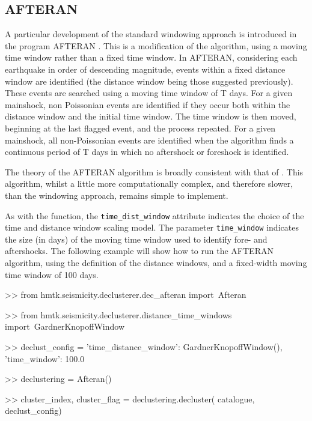 \subsection{AFTERAN \parencite{Musson1999PSHABalkan}}

A particular development of the standard windowing approach is introduced in the program AFTERAN \parencite{Musson1999PSHABalkan}. This is a modification of the \textcite{GardnerKnopoff1974} algorithm, using a moving time window rather than a fixed time window. In AFTERAN, considering each earthquake in order of descending magnitude, events within a fixed distance window are identified (the distance window being those suggested previously). These events are searched using a moving time window of T days. For a given mainshock, non Poissonian events are identified if they occur both within the distance window and the initial time window. The time window is then moved, beginning at the last flagged event, and the process repeated. For a given mainshock, all non-Poissonian events are identified when the algorithm finds a continuous period of T days in which no aftershock or foreshock is identified. 

The theory of the AFTERAN algorithm is broadly consistent with that of \textcite{GardnerKnopoff1974}. This algorithm, whilst a little more computationally complex, and therefore slower, than the \textcite{GardnerKnopoff1974} windowing approach, remains simple to implement. 

As with the \textcite{GardnerKnopoff1974} function, the \verb=time_dist_window= attribute indicates the choice of the time and distance window scaling model. The parameter \verb=time_window= indicates the size (in days) of the moving time window used to identify fore- and aftershocks. The following example will show how to run the AFTERAN algorithm, using the  \textcite{GardnerKnopoff1974} definition of the distance windows, and a fixed-width moving time window of 100 days.

  
\begin{python}[frame=single]

>> from hmtk.seismicity.declusterer.dec_afteran import\
    Afteran

>> from hmtk.seismicity.declusterer.distance_time_windows import\
    GardnerKnopoffWindow   
 
>> declust_config = {
    'time_distance_window': GardnerKnopoffWindow(),
    'time_window': 100.0} 

>> declustering = Afteran()

>> cluster_index, cluster_flag = declustering.decluster(
    catalogue,
    declust_config)
\end{python} 

